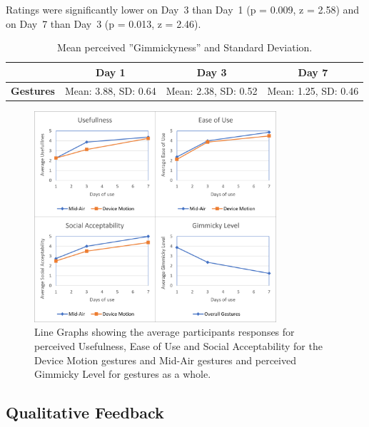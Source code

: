 \documentclass{l4proj}
\begin{document}
Ratings were significantly lower on Day~3 than Day~1 (p = 0.009, z = 2.58) and on Day~7 than Day~3 (p = 0.013, z = 2.46).

\begin{table}
\centering
\begin{tabular}{r c c c}
                              & \textbf{Day 1} & \textbf{Day 3} & \textbf{Day 7} \\ \toprule
    \textbf{Gestures}       & Mean: 3.88, SD: 0.64   & Mean: 2.38, SD: 0.52    & Mean: 1.25, SD: 0.46 \\ \bottomrule
\end{tabular}
\caption{Mean perceived ''Gimmickyness'' and Standard Deviation.}
\label{table:Gimmick}
\end{table}

\begin{figure}[!htb]
    \centering
    \includegraphics[width=0.8\textwidth]{images/Combined Preceptions.png}
        \caption{Line Graphs showing the average participants responses for perceived Usefulness, Ease of Use and Social Acceptability for the Device Motion gestures and Mid-Air gestures and perceived Gimmicky Level for gestures as a whole.}
        \label{fig:perceptions}
\end{figure}

\subsection{Qualitative Feedback}
\end{document}
